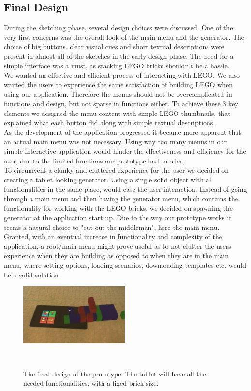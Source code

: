 \subsection{Final Design}
During the sketching phase, several design choices were discussed. One of the very first concerns was the overall look of the main menu and the generator. The choice of big buttons, clear visual cues and short textual descriptions were present in almost all of the sketches in the early design phase. The need for a simple interface was a must, as stacking LEGO bricks shouldn't be a hassle. \\
We wanted an effective and efficient process of interacting with LEGO. We also wanted the users to experience the same satisfaction of building LEGO when using our application. Therefore the menus should not be overcomplicated in functions and design, but not sparse in functions either. To achieve these 3 key elements we designed the menu content with simple LEGO thumbnails, that explained what each button did along with simple textual descriptions. \\
As the development of the application progressed it became more  apparent that an actual main menu was not necessary. Using way too many menus in our simple interactive application would hinder the effectiveness and efficiency for the user, due to the limited functions our prototype had to offer. \\
To circumvent a clunky and cluttered experience for the user we decided on creating a tablet looking generator. Using a single solid object with all functionalities in the same place, would ease the user interaction. Instead of going through a main menu and then having the generator menu, which contains the functionality for working with the LEGO bricks, we decided on spawning the generator at the application start up. Due to the way our prototype works it seems a natural choice to "cut out the middleman", here the main menu.  \\ 
Granted, with an eventual increase in functionality and complexity of the application, a root/main menu might prove useful as to not clutter the users experience when they are building as opposed to when they are in the main menu, where setting options, loading scenarios, downloading templates etc. would be a valid solution.\\
\begin{figure}[t]
	\centering
	\includegraphics[width=210px]{figures/finaldesign.jpg}
	\caption{The final design of the prototype. The tablet will have all the needed functionalities, with a fixed brick size.}~\label{fig:finaldesign}
\end{figure}
